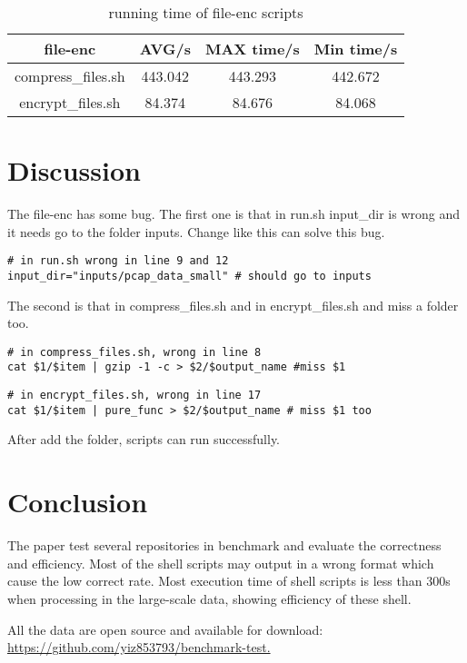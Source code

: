 \documentclass[sigplan, screen, 10pt]{acmart}
\begin{document}
\begin{table}[]
    \centering
    \begin{tabular}{c|c|c|c}
        \textbf{file-enc}& \textbf{AVG/s} & \textbf{MAX time/s} & \textbf{Min time/s} \\
         \hline
         compress_files.sh & 443.042 & 443.293 & 442.672 \\
         encrypt_files.sh & 84.374 & 84.676 & 84.068 \\
         \hline
    \end{tabular}
    \caption{running time of file-enc scripts}
\end{table}

\section{Discussion}
\label{dis}

The file-enc has some bug.
The first one is that in run.sh input\_dir is wrong and it needs go to the folder inputs.
Change like this can solve this bug.
\begin{verbatim}
# in run.sh wrong in line 9 and 12
input_dir="inputs/pcap_data_small" # should go to inputs
\end{verbatim}

The second is that in compress\_files.sh and in encrypt\_files.sh and miss a folder too.
\begin{verbatim}
# in compress_files.sh, wrong in line 8
cat $1/$item | gzip -1 -c > $2/$output_name #miss $1
\end{verbatim}

\begin{verbatim}
# in encrypt_files.sh, wrong in line 17
cat $1/$item | pure_func > $2/$output_name # miss $1 too
\end{verbatim}
After add the folder, scripts can run successfully.

\section{Conclusion}
\label{conclusion}
The paper test several repositories in benchmark and evaluate the correctness and efficiency. Most of the shell scripts may output in a wrong format which cause the low correct rate. 
Most execution time of shell scripts is less than 300s when processing in the large-scale data, showing efficiency of these shell. \par
All the data are open source and available for download: \href{https://github.com/yiz853793/benchmark-test}{https://github.com/yiz853793/benchmark-test.}


{\small

}
\end{document}

